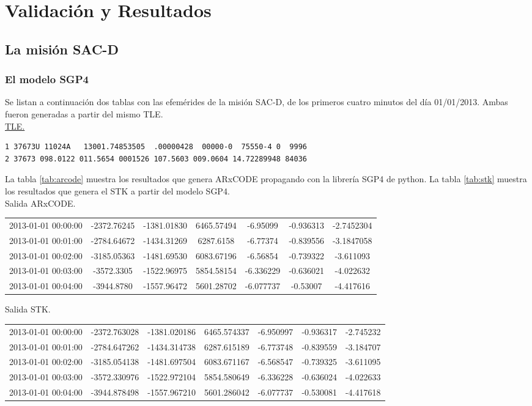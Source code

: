 \chapter{Validaci\'on y Resultados}
\label{chap:resultados}

\section{La misi\'on SAC-D}
\subsection{El modelo SGP4}
Se listan a continuaci\'on dos tablas con las efem\'erides de la misi\'on SAC-D, de los primeros cuatro minutos del d\'ia 01/01/2013.
Ambas fueron generadas a partir del mismo TLE.\\

\underline{TLE.}
\begin{verbatim}
1 37673U 11024A   13001.74853505  .00000428  00000-0  75550-4 0  9996
2 37673 098.0122 011.5654 0001526 107.5603 009.0604 14.72289948 84036
\end{verbatim}

La tabla \ref{tab:arcode} muestra los resultados que genera ARxCODE propagando con la librer\'ia SGP4 de python.
La tabla \ref{tab:stk} muestra los resultados que genera el STK a partir del modelo SGP4.\\

Salida ARxCODE.\\

\begin{tabular}{lcccccc}
2013-01-01 00:00:00&-2372.76245& -1381.01830& 6465.57494& -6.95099& -0.936313& -2.7452304\\
2013-01-01 00:01:00& -2784.64672& -1434.31269& 6287.6158& -6.77374& -0.839556& -3.1847058\\
2013-01-01 00:02:00& -3185.05363& -1481.69530& 6083.67196& -6.56854& -0.739322& -3.611093\\
2013-01-01 00:03:00& -3572.3305& -1522.96975& 5854.58154& -6.336229& -0.636021& -4.022632\\
2013-01-01 00:04:00& -3944.8780& -1557.96472& 5601.28702& -6.077737& -0.53007& -4.417616
\label{tab:arcode}
\end{tabular}

Salida STK.\\

\begin{tabular}{lcccccc}
2013-01-01 00:00:00&-2372.763028&-1381.020186&6465.574337&-6.950997&-0.936317&-2.745232\\
2013-01-01 00:01:00&-2784.647262&-1434.314738&6287.615189&-6.773748&-0.839559&-3.184707\\
2013-01-01 00:02:00&-3185.054138&-1481.697504&6083.671167&-6.568547&-0.739325&-3.611095\\
2013-01-01 00:03:00&-3572.330976&-1522.972104&5854.580649&-6.336228&-0.636024&-4.022633\\
2013-01-01 00:04:00&-3944.878498&-1557.967210&5601.286042&-6.077737&-0.530081&-4.417618
\label{tab:stk}
\end{tabular}

